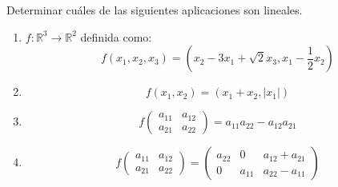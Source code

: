 \begin{enunciado}{\ejercicio}
  Determinar cuáles de las siguientes aplicaciones son lineales.
  \begin{enumerate}[label=(\alph*)]
  \item $f: \mathbb{R}^3 \to \mathbb{R}^2$ definida como:   \[
    f(x_1, x_2, x_3) = (x_2 - 3x_1 + \sqrt{2}x_3, x_1 - \frac{1}{2} x_2)
    \]
  \item \[f(x_1, x_2) = (x_1 + x_2, |x_1|)\]

  \item \[f \begin{pmatrix} a_{11} & a_{12} \\ a_{21} & a_{22} \end{pmatrix} =
  a_{11} a_{22} - a_{12} a_{21}
  \]
  \item \[f \begin{pmatrix} a_{11} & a_{12} \\ a_{21} & a_{22} \end{pmatrix} =
  \begin{pmatrix} a_{22} & 0 & a_{12} + a_{21} \\ 0 & a_{11} & a_{22} - a_{11} \end{pmatrix}
  \]

  \end{enumerate}
\end{enunciado}

